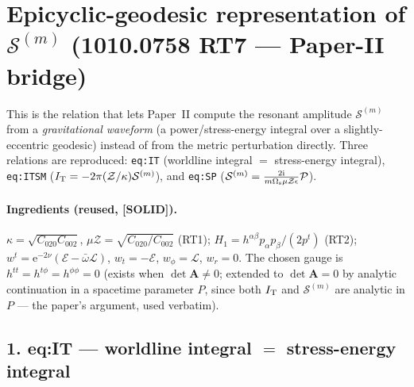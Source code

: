 \documentclass{article}
\newcommand{\rmi}{\mathrm{i}}
\newcommand{\rme}{\mathrm{e}}
\newcommand{\mass}{\mu}
\newcommand{\oomega}{\bar\omega}
\begin{document}
\section*{Epicyclic-geodesic representation of $\mathcal{S}^{(m)}$ (1010.0758 RT7 --- Paper-II bridge)}

This is the relation that lets Paper~II compute the resonant amplitude $\mathcal{S}^{(m)}$ from a
\emph{gravitational waveform} (a power/stress-energy integral over a slightly-eccentric geodesic) instead of
from the metric perturbation directly. Three relations are reproduced: \texttt{eq:IT} (worldline integral
$=$ stress-energy integral), \texttt{eq:ITSM} ($I_{\rm T}=-2\pi(\mathcal{Z}/\kappa)\mathcal{S}^{(m)}$), and
\texttt{eq:SP} ($\mathcal{S}^{(m)}=\tfrac{2\rmi}{m\Omega_{\rm s}\mass\mathcal{Z}\epsilon}\mathcal{P}$).

\paragraph{Ingredients (reused, [SOLID]).} $\kappa=\sqrt{C_{020}C_{002}}$, $\mass\mathcal{Z}=\sqrt{C_{020}/C_{002}}$
(RT1); $H_1=h^{\alpha\beta}p_\alpha p_\beta/(2p^t)$ (RT2); $w^t=\rme^{-2\nu}(\mathcal{E}-\oomega\mathcal{L})$,
$w_t=-\mathcal{E}$, $w_\phi=\mathcal{L}$, $w_r=0$. The chosen gauge is $h^{tt}=h^{t\phi}=h^{\phi\phi}=0$ (exists
when $\det\mathbf{A}\neq0$; extended to $\det\mathbf{A}=0$ by analytic continuation in a spacetime parameter
$P$, since both $I_{\rm T}$ and $\mathcal{S}^{(m)}$ are analytic in $P$ --- the paper's argument, used verbatim).

\subsection*{1. eq:IT --- worldline integral $=$ stress-energy integral}
\end{document}
